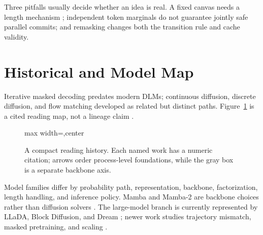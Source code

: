 \documentclass{article}
\begin{document}
Three pitfalls usually decide whether an idea is real.  A fixed canvas needs a
length mechanism \citep{sahoo2024mdlm,arriola2025block,cheng2026length};
independent token marginals do not guarantee jointly safe parallel commits; and
remasking changes both the transition rule and cache validity.

\section{Historical and Model Map}

Iterative masked decoding predates modern DLMs; continuous diffusion, discrete
diffusion, and flow matching developed as related but distinct paths.
Figure~\ref{fig:timeline} is a cited reading map, not a lineage claim
\citep{yu2025survey}.

\begin{figure}[t]
\centering
\begin{adjustbox}{max width=\columnwidth,center}
\end{adjustbox}
\caption{A compact reading history.  Each named work has a numeric citation;
arrows order process-level foundations, while the gray box is a separate
backbone axis.}
\label{fig:timeline}
\end{figure}

Model families differ by probability path, representation, backbone,
factorization, length handling, and inference policy.  Mamba and Mamba-2 are
backbone choices rather than diffusion solvers \citep{gu2024mamba,dao2024mamba2}.
The large-model branch is currently represented by LLaDA, Block Diffusion, and
Dream \citep{nie2025llada,arriola2025block,ye2025dream}; newer work studies
trajectory mismatch, masked pretraining, and scaling
\citep{he2025mdpo,nie2026illada,sahoo2026scaling}.
\end{document}
